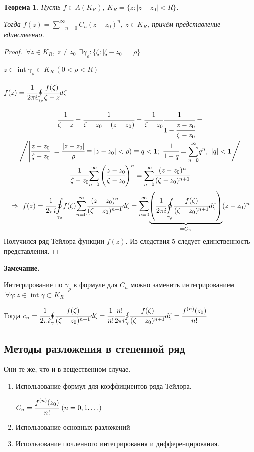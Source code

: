 \documentclass[final]{report}
\renewcommand{\bf}{\bfseries}
\newcommand{\then}{\ \Rightarrow\ }
\newcommand{\moint}[1]{\underset{#1}{\oint}}
\newcommand{\msum}[2]{\underset{#1}{\overset{#2}{\sum}}}
\newcommand{\ssum}{\msum{n=0}{\infty}}
\newcommand{\Int}{\mathop{\mathrm{int}}\nolimits}
\newcommand{\g}{\gamma}
\newcommand{\E}{\ \exists}
\newcommand{\F}{\ \forall}
\newtheorem*{theor}{Теорема}
\theoremstyle{remark}
\begin{document}
\begin{theor}
Пусть $f\in A(K_R),\ K_R=\{z\colon|z-z_0|<R\}$.

Тогда $f(z)=\ssum C_n(z-z_0)^n,\ z\in K_R$, причём представление единственно.
\end{theor}
\begin{proof}
$\F z\in K_R,\ z\neq z_0\ \E \g_\rho\colon\{\zeta\colon|\zeta-z_0|=\rho\}$

$z\in\Int\g_\rho\subset K_R\ (0<\rho<R)$

$f(z)=\cfrac1{2\pi i}\moint{\g_\rho}\cfrac{f(\zeta)}{\zeta-z}d\zeta$

\begin{multline*}
\cfrac1{\zeta-z}=\cfrac1{\zeta-z_0-(z-z_0)}=\cfrac1{\zeta-z_0}\cfrac1{1-\cfrac{z-z_0}{\zeta-z_0}}=\\
\left/\left|\cfrac{z-z_0}{\zeta-z_0}\right|=\cfrac{|z-z_0|}{\rho}\equiv|z-z_0|<\rho)\equiv q<1;\ \cfrac1{1-q}=\ssum q^n,\ |q|<1\right/\\
\cfrac1{\zeta-z_0}\ssum\left(\cfrac{z-z_0}{\zeta-z_0}\right)^n=\ssum\cfrac{(z-z_0)^n}{(\zeta-z_0)^{n+1}}
\end{multline*}
$$
\then f(z)=\cfrac1{2\pi i}\moint{\g_\rho}f(\zeta)\ssum\cfrac{(z-z_0)^n}{(\zeta-z_0)^{n+1}}d\zeta=\ssum\underset{=C_n}{\underbrace{\left(\cfrac1{2\pi i}\moint{\g_\rho}\cfrac{f(\zeta)}{(\zeta-z_0)^{n+1}}d\zeta\right)}}(z-z_0)^n
$$
Получился ряд Тейлора функции $f(z)$. Из следствия 5 следует единственность представления.
\end{proof}
{\bf Замечание.}

Интегрирование по $\g_\rho$ в формуле для $C_n$ можно заменить интегрированием $\F \g\colon z\in\Int\g\subset K_R$

Тогда $c_n=\cfrac1{2\pi i}\moint{\g}\cfrac{f(\zeta)}{(\zeta-z_0)^{n+1}}d\zeta=\cfrac1{n!}\cfrac{n!}{2\pi i}\moint{\g}\cfrac{f(\zeta)}{(\zeta-z_0)^{n+1}}d\zeta=\cfrac{f^{(n)}(z_0)}{n!}$

\subsection{Методы разложения в степенной ряд}

Они те же, что и в вещественном случае.
\begin{enumerate}
\item Использование формул для коэффициентов ряда Тейлора.

$C_n=\cfrac{f^{(n)}(z_0)}{n!}\ (n=0,1,\ldots)$
\item Использование основных разложений
\item Использование почленного интегрирования и дифференцирования.
\end{enumerate}
\end{document}
